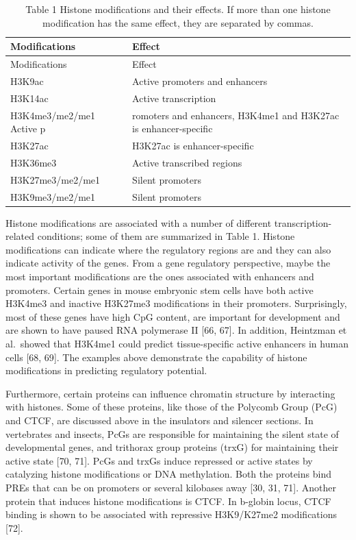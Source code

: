 \documentclass[12pt,]{krantz}
\theoremstyle{definition}
\theoremstyle{definition}
\theoremstyle{definition}
\theoremstyle{remark}
\begin{document}
\begin{longtable}[]{@{}ll@{}}
\caption{Table 1 Histone modifications and their effects. If more than
one histone modification has the same effect, they are separated by
commas.}\tabularnewline
\toprule
Modifications & Effect\tabularnewline
\midrule
\endfirsthead
\toprule
Modifications & Effect\tabularnewline
\midrule
\endhead
H3K9ac & Active promoters and enhancers\tabularnewline
H3K14ac & Active transcription\tabularnewline
H3K4me3/me2/me1 Active p & romoters and enhancers, H3K4me1 and H3K27ac
is enhancer-specific\tabularnewline
H3K27ac & H3K27ac is enhancer-specific\tabularnewline
H3K36me3 & Active transcribed regions\tabularnewline
H3K27me3/me2/me1 & Silent promoters\tabularnewline
H3K9me3/me2/me1 & Silent promoters\tabularnewline
\bottomrule
\end{longtable}

Histone modifications are associated with a number of different
transcription-related conditions; some of them are summarized in Table
1. Histone modifications can indicate where the regulatory regions are
and they can also indicate activity of the genes. From a gene regulatory
perspective, maybe the most important modifications are the ones
associated with enhancers and promoters. Certain genes in mouse
embryonic stem cells have both active H3K4me3 and inactive H3K27me3
modifications in their promoters. Surprisingly, most of these genes have
high CpG content, are important for development and are shown to have
paused RNA polymerase II {[}66, 67{]}. In addition, Heintzman et
al.~showed that H3K4me1 could predict tissue-specific active enhancers
in human cells {[}68, 69{]}. The examples above demonstrate the
capability of histone modifications in predicting regulatory potential.

Furthermore, certain proteins can influence chromatin structure by
interacting with histones. Some of these proteins, like those of the
Polycomb Group (PcG) and CTCF, are discussed above in the insulators and
silencer sections. In vertebrates and insects, PcGs are responsible for
maintaining the silent state of developmental genes, and trithorax group
proteins (trxG) for maintaining their active state {[}70, 71{]}. PcGs
and trxGs induce repressed or active states by catalyzing histone
modifications or DNA methylation. Both the proteins bind PREs that can
be on promoters or several kilobases away {[}30, 31, 71{]}. Another
protein that induces histone modifications is CTCF. In b-globin locus,
CTCF binding is shown to be associated with repressive H3K9/K27me2
modifications {[}72{]}.
\end{document}
